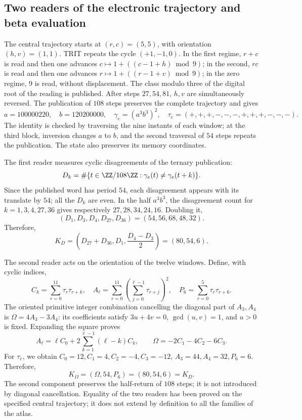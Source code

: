 \subsection{Two readers of the electronic trajectory and beta evaluation}
\label{vi:vi:dep:beta}

The central trajectory starts at \((r,c)=(5,5)\), with
orientation \((h,v)=(1,1)\). TRIT repeats the cycle \((+1,-1,0)\).
In the first regime, \(r+c\) is read and then one advances
\(c\mapsto1+((c-1+h)\bmod9)\); in the second, \(rc\) is read and
then one advances \(r\mapsto1+((r-1+v)\bmod9)\); in the zero
regime, \(9\) is read, without displacement. The class modulo
three of the digital root of the reading is published. After steps \(27,54,81\),
\(h,v\) are simultaneously reversed. The publication of \(108\)
steps preserves the complete trajectory and gives
\begin{equation}
 a=100000220,\quad b=120200000,\quad
 \gamma_e=(a^3b^3)^2,
 \quad\tau_e=(+,+,+,-,-,-,+,+,+,-,-,-).
 \label{vi:vi:dep:trayectoria-electron}
\end{equation}
The identity is checked by traversing the nine instants of each
window; at the third block, inversion changes \(a\) to \(b\),
and the second traversal of \(54\) steps repeats the publication.
The state also preserves its memory coordinates.

The first reader measures cyclic disagreements of the ternary publication:
\[
 D_k=\#\{t\in\ZZ/108\ZZ:\gamma_e(t)\ne\gamma_e(t+k)\}.
\]
Since the published word has period \(54\), each disagreement
appears with its translate by \(54\); all the \(D_k\) are even.
In the half \(a^3b^3\), the disagreement count for
\(k=1,3,4,27,36\) gives respectively \(27,28,34,24,16\).
Doubling it,
\[
 (D_1,D_3,D_4,D_{27},D_{36})=(54,56,68,48,32).
\]
Therefore,
\begin{equation}
 K_D=\left(D_{27}+D_{36},D_1,\frac{D_4-D_3}{2}\right)
     =(80,54,6).
 \label{vi:vi:dep:KD}
\end{equation}

The second reader acts on the orientation of the twelve windows.
Define, with cyclic indices,
\[
 C_k=\sum_{r=0}^{11}\tau_r\tau_{r+k},\quad
 A_\ell=\sum_{r=0}^{11}\left(\sum_{j=0}^{\ell-1}\tau_{r+j}\right)^2,
 \quad P_6=\sum_{r=0}^{5}\tau_r\tau_{r+6}.
\]
The oriented primitive integer combination cancelling the diagonal part
of \(A_3,A_4\) is \(\Omega=4A_3-3A_4\): its coefficients
satisfy \(3u+4v=0\), \(\gcd(u,v)=1\), and \(u>0\) is fixed.
Expanding the square proves
\[
 A_\ell=\ell C_0+
     2\sum_{k=1}^{\ell-1}(\ell-k)C_k,
 \qquad\Omega=-2C_1-4C_2-6C_3.
\]
For \(\tau_e\), we obtain
\(C_0=12,C_1=4,C_2=-4,C_3=-12\),
\(A_3=44,A_4=32,P_6=6\). Therefore,
\begin{equation}
 K_\Omega=(\Omega,54,P_6)=(80,54,6)=K_D.
 \label{vi:vi:dep:KOmega}
\end{equation}
The second component preserves the half-return of \(108\) steps;
it is not introduced by diagonal cancellation. Equality of the two
readers has been proved on the specified central trajectory;
it does not extend by definition to all the families of the atlas.

